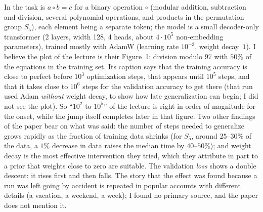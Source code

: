 \begin{beyond}
In \citet{power2022} the task is $a\circ b=c$ for a binary operation $\circ$ (modular addition, subtraction and division, several polynomial operations, and products in the permutation group $S_5$), each element being a separate token; the model is a small decoder-only transformer (2 layers, width 128, 4 heads, about $4\cdot10^5$ non-embedding parameters), trained mostly with AdamW (learning rate $10^{-3}$, weight decay~$1$). I believe the plot of the lecture is their Figure~1: division modulo $97$ with $50\%$ of the equations in the training set. Its caption says that the training accuracy is close to perfect before $10^3$ optimization steps, that  appears until $10^5$ steps, and that it takes close to $10^6$ steps for the validation accuracy to get there (that run used Adam \emph{without} weight decay, to show how late generalization can begin; I did not see the plot). So ``$10^2$ to $10^5$'' of the lecture is right in order of magnitude for the onset, while the jump itself completes later in that figure. Two other findings of the paper bear on what was said: the number of steps needed to generalize grows rapidly as the fraction of training data shrinks (for $S_5$, around $25$--$30\%$ of the data, a $1\%$ decrease in data raises the median time by $40$--$50\%$); and weight decay is the most effective intervention they tried, which they attribute in part to a prior that weights close to zero are suitable. The validation \emph{loss} shows a double descent: it rises first and then falls. The story that the effect was found because a run was left going by accident is repeated in popular accounts with different details (a vacation, a weekend, a week); I found no primary source, and the paper does not mention it.
\end{beyond}


